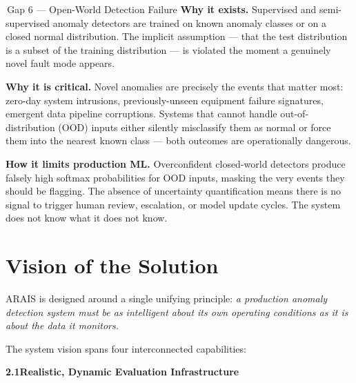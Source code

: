 \documentclass[11pt, a4paper]{article}
\newcommand{\pillar}[1]{\textbf{\textcolor{primary}{#1}}}
\begin{document}
\vspace{8pt}

\begin{gapbox}{\,Gap 6\; —\; Open-World Detection Failure}
\textbf{Why it exists.}\;
Supervised and semi-supervised anomaly detectors are trained on known anomaly classes or on 
a closed normal distribution. The implicit assumption — that the test distribution is a subset 
of the training distribution — is violated the moment a genuinely novel fault mode appears.

\smallskip
\textbf{Why it is critical.}\;
Novel anomalies are precisely the events that matter most: zero-day system intrusions, 
previously-unseen equipment failure signatures, emergent data pipeline corruptions.
Systems that cannot handle out-of-distribution (OOD) inputs either silently misclassify them 
as normal or force them into the nearest known class — both outcomes are operationally dangerous.

\smallskip
\textbf{How it limits production ML.}\;
Overconfident closed-world detectors produce falsely high softmax probabilities for OOD inputs,
masking the very events they should be flagging. The absence of uncertainty quantification means 
there is no signal to trigger human review, escalation, or model update cycles. 
The system does not know what it does not know.
\end{gapbox}

\vspace{2pt}

\section{Vision of the Solution}

ARAIS is designed around a single unifying principle:
\textit{a production anomaly detection system must be as intelligent about its own operating conditions 
as it is about the data it monitors.}

The system vision spans four interconnected capabilities:

\vspace{8pt}
\noindent\pillar{2.1\quad Realistic, Dynamic Evaluation Infrastructure}
\vspace{4pt}
\end{document}
